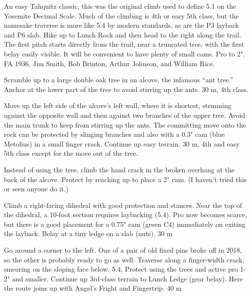 \documentclass{tahquitz}
\begin{document}


An easy Tahquitz classic, this was the original climb used to define
5.1 on the Yosemite Decimal Scale. Much of the
climbing is 4th or easy 5th class, but the namesake traverse is more
like 5.4 by modern standards, as are the P3 layback and P6 slab.
Hike up to Lunch Rock and then head to the right along the
trail. The first pitch starts directly from the trail, near a 
truncated tree, with the first belay easily visible. It will be
convenient to have plenty of small cams. Pro to 2". FA
1936, Jim Smith, Bob Brinton, Arthur Johnson, and William Rice.

\somespace

 Scramble up to a large double oak tree in an alcove, the infamous
``ant tree.'' Anchor at the lower part of the tree to avoid stirring up
the ants. 30 m, 4th class.

 Move up the left side of the alcove's left wall, where it is
shortest, stemming against the opposite wall and then against two  branches
of the upper tree. Avoid the main trunk to keep from stirring up the ants.
The committing move onto the rock can be protected by slinging branches and
also with a 0.3" cam (blue Metolius) in a small
finger crack. Continue up easy terrain. 30 m, 4th and easy 5th class
except for the move out of the tree.

 Instead of using the tree, climb the hand crack in the broken overhang at
the back of the alcove. Protect by reaching up to place
a 2" cam. (I haven't tried this or seen anyone do it.)

 Climb a right-facing dihedral with good protection and
stances. Near the top of the dihedral, a 10-foot section requires laybacking (5.4).
Pro now becomes scarce, but there is a good placement for a 0.75" cam (green C4) immediately
on exiting the layback.
Belay at a tiny ledge on a slab (nuts). 30 m

 Go around a corner to the left. One of a pair of old fixed pins
broke off in 2018, so the other is probably ready to go as well.
Traverse along a finger-width crack,
smearing on the sloping face below, 5.4. Protect using the trees and
active pro 1-2" and smaller. Continue up 3rd-class terrain to Lunch Ledge (gear
belay). Here the route joins up with Angel's Fright and Fingertrip. 40 m

\end{document}
